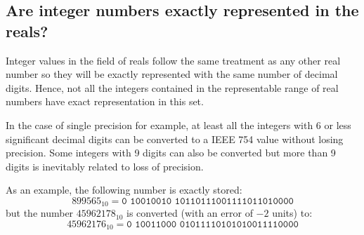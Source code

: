         \subsection{Are integer numbers exactly represented in the reals?}


Integer values in the field of reals follow the same treatment as any other real number so they will be exactly represented with the same number of decimal digits. 
Hence, not all the integers contained in the representable range of real numbers have exact representation in this set. 

In the case of single precision for example, at least all the integers with 6 or less significant decimal digits can be converted to a IEEE 754 value without losing precision. 
Some integers with 9 digits can also be converted but more than 9 digits is inevitably related to loss of precision. 

As an example, the following number is exactly stored: 
$$
899565_{10} = \texttt{0 10010010 10110111001111011010000}
$$
but the number $45962178_{10}$ is converted (with an error of $-2$ units) to:
$$
45962176_{10} = \texttt{0 10011000 01011110101010011110000}
$$






